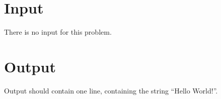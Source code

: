 
\section*{Input}

There is no input for this problem.

\section*{Output}

Output should contain one line, containing the string ``Hello World!''. 
